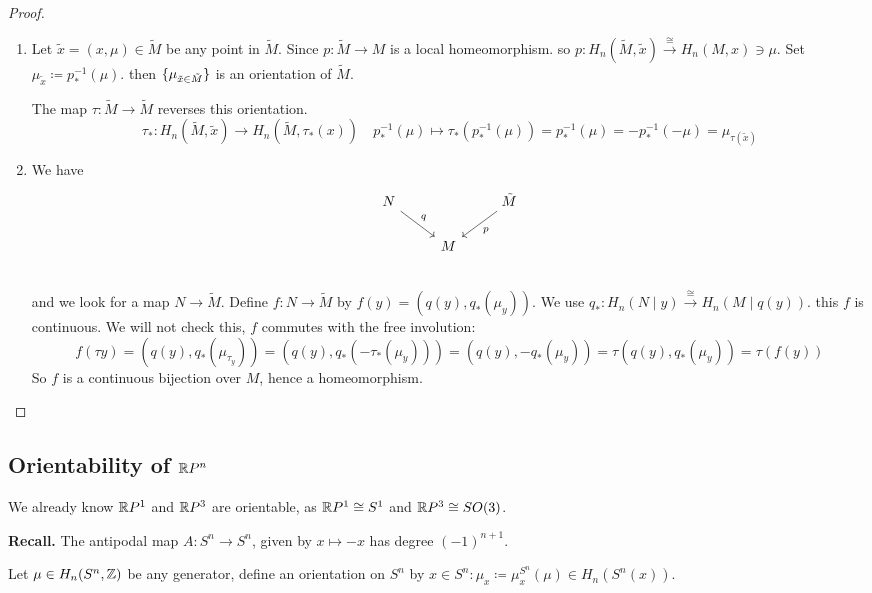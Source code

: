 \documentclass[language=english]{TemplateLecture}
\begin{document}
\begin{proof}\leavevmode
    \begin{enumerate}
        \item Let \(\tilde x = (x, \mu) \in \tilde M\) be any point in \(\tilde M\). Since \(p\colon \tilde M \to M\) is a local homeomorphism. so \(p\colon H_n(\tilde M, \tilde x) \xrightarrow{\cong} H_n(M, x) \ni \mu\). Set \(\mu_{\tilde x} \coloneq p_*^{-1}(\mu)\). then \(\{\mu_{\tilde x \in \tilde M}\}\) is an orientation of \(\tilde M\).
        
        The map \(\tau \colon \tilde M \to \tilde M\) reverses this orientation.
        \[\tau_*\colon H_n(\tilde M, \tilde x) \to H_n(\tilde M, \tau_*(x))\quad p_*^{-1}(\mu)\mapsto \tau_*(p_*^{-1}(\mu)) = p_*^{-1}(\mu) = - p_*^{-1}(-\mu) = \mu_{\tau(\tilde x)}\]

        \item We have
        \[\begin{tikzcd}
            N \ar[rd, "q"] & & \tilde M \ar[ld, "p"]\\
            & M & \\
        \end{tikzcd}\]
        and we look for a map \(N \to \tilde M\). Define \(f\colon N \to \tilde M\) by \(f(y) = (q(y), q_*(\mu_y))\). We use \(q_*\colon H_n(N\mid y) \xrightarrow{\cong} H_n(M\mid q(y))\). this \(f\) is continuous. We will not check this, \(f\) commutes with the free involution:
        \[f(\tau y) = (q(y), q_*(\mu_{\tau_y})) = (q(y), q_*(-\tau_*(\mu_y))) = (q(y), -q_*(\mu_y)) = \tau(q(y), q_*(\mu_y)) = \tau(f(y))\]
        So \(f\) is a continuous bijection over \(M\), hence a homeomorphism.
    \end{enumerate}
\end{proof}

\subsection{Orientability of \(\mathbb{R} P^n\)}

We already know \(\mathbb{R} P ^1\) and \(\mathbb{R} P^3\) are orientable, as \(\mathbb{R} P^1 \cong S^1\) and \(\mathbb{R} P^3 \cong SO(3)\).

\textbf{Recall.} The antipodal map \(A\colon S^n \to S^n\), given by \(x \mapsto -x\) has degree \((-1)^{n+1}\).

Let \(\mu \in H_n(S^n, \mathbb{Z})\) be any generator, define an orientation on \(S^n\) by \(x \in S^n : \mu_x \coloneq \mu_x^{S^n}(\mu) \in H_n(S^n(x))\).
\end{document}
